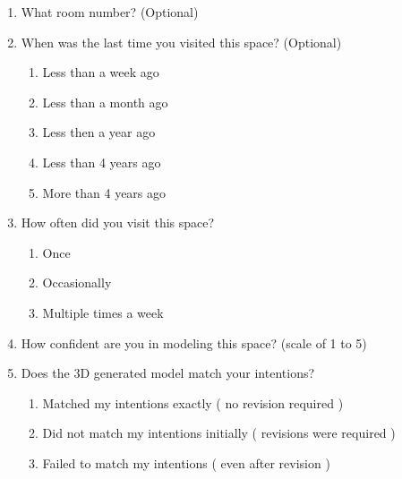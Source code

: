 \documentclass[12pt]{article}
\begin{document}
\begin{enumerate}
    \item What room number? (Optional)
    \item When was the last time you visited this space? (Optional)
      \begin{enumerate}
        \item Less than a week ago
        \item Less than a month ago
        \item Less then a year ago
        \item Less than 4 years ago
        \item More than 4 years ago
      \end{enumerate}
    \item How often did you visit this space?
      \begin{enumerate}
        \item Once
        \item Occasionally
        \item Multiple times a week
      \end{enumerate}
    \item How confident are you in modeling this space? (scale of 1 to 5)
    \item Does the 3D generated model match your intentions?
      \begin{enumerate}
        \item Matched my intentions exactly ( no revision required )
        \item Did not match my intentions initially ( revisions were required )
        \item Failed to match my intentions ( even after revision )
      \end{enumerate}
  \end{enumerate}

\newpage 
\end{document}
